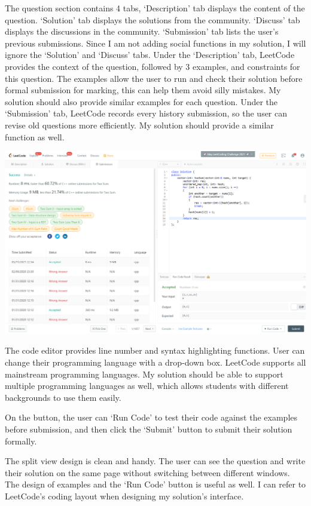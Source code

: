 \documentclass[a4paper]{report}
\begin{document}
The question section contains 4 tabs, `Description' tab displays the content of the question. `Solution' tab displays the solutions from the community. `Discuss' tab displays the discussions in the community. `Submission' tab lists the user's previous submissions. Since I am not adding social functions in my solution, I will ignore the `Solution' and `Discuss' tabs. Under the `Description' tab, LeetCode provides the context of the question, followed by 3 examples, and constraints for this question. The examples allow the user to run and check their solution before formal submission for marking, this can help them avoid silly mistakes. My solution should also provide similar examples for each question. Under the `Submission' tab, LeetCode records every history submission, so the user can revise old questions more efficiently. My solution should provide a similar function as well.

\includegraphics[width=\linewidth]{Two-Sum-LeetCode-Submission}

The code editor provides line number and syntax highlighting functions. User can change their programming language with a drop-down box. LeetCode supports all mainstream programming languages. My solution should be able to support multiple programming languages as well, which allows students with different backgrounds to use them easily.

On the button, the user can `Run Code' to test their code against the examples before submission, and then click the `Submit' button to submit their solution formally.

The split view design is clean and handy. The user can see the question and write their solution on the same page without switching between different windows. The design of examples and the `Run Code' button is useful as well. I can refer to LeetCode's coding layout when designing my solution's interface.
\end{document}
